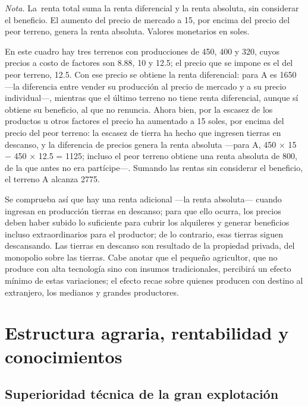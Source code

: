 \documentclass[
  man,
  floatsintext,
  longtable,
  a4paper,
  nolmodern,
  notxfonts,
  notimes,
  12pt,
  colorlinks=true,linkcolor=blue,citecolor=blue,urlcolor=blue]{apa7}
\begin{document}
\begin{table}
\vspace{-20pt}
\noindent \emph{Nota.} La~renta total suma la renta diferencial y la
renta absoluta, sin considerar el beneficio. El aumento del precio de
mercado a 15, por encima del precio del peor terreno, genera la renta
absoluta. Valores monetarios en soles.

\end{table}

En este cuadro hay tres terrenos con producciones de 450, 400 y 320,
cuyos precios a costo de factores son 8.88, 10 y 12.5; el precio que se
impone es el del peor terreno, 12.5. Con ese precio se obtiene la renta
diferencial: para A es 1650 ---la diferencia entre vender su producción
al precio de mercado y a su precio individual---, mientras que el último
terreno no tiene renta diferencial, aunque sí obtiene su beneficio, al
que no renuncia. Ahora bien, por la escasez de los productos u otros
factores el precio ha aumentado a 15 soles, por encima del precio del
peor terreno: la escasez de tierra ha hecho que ingresen tierras en
descanso, y la diferencia de precios genera la renta absoluta ---para A,
450 × 15 − 450 × 12.5 = 1125; incluso el peor terreno obtiene una renta
absoluta de 800, de la que antes no era partícipe---. Sumando las rentas
sin considerar el beneficio, el terreno A alcanza 2775.

Se comprueba así que hay una renta adicional ---la renta absoluta---
cuando ingresan en producción tierras en descanso; para que ello ocurra,
los precios deben haber subido lo suficiente para cubrir los alquileres
y generar beneficios incluso extraordinarios para el productor; de lo
contrario, esas tierras siguen descansando. Las tierras en descanso son
resultado de la propiedad privada, del monopolio sobre las tierras. Cabe
anotar que el pequeño agricultor, que no produce con alta tecnología
sino con insumos tradicionales, percibirá un efecto mínimo de estas
variaciones; el efecto recae sobre quienes producen con destino al
extranjero, los medianos y grandes productores.

\section{Estructura agraria, rentabilidad y
conocimientos}\label{estructura-agraria-rentabilidad-y-conocimientos}

\subsection{Superioridad técnica de la gran
explotación}\label{superioridad-tuxe9cnica-de-la-gran-explotaciuxf3n}
\end{document}

